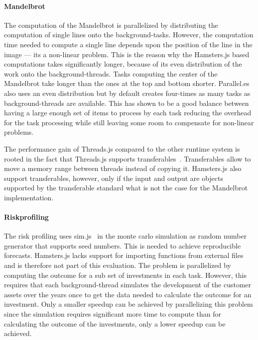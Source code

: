 \paragraph{Mandelbrot}
The computation of the Mandelbrot is parallelized by distributing the computation of single lines onto the background-tasks. However, the computation time needed to compute a single line depends upon the position of the line in the image --- its a non-linear problem. This is the reason why the Hamsters.js based computations takes significantly longer, because of its even distribution of the work onto the background-threads. Tasks computing the center of the Mandelbrot take longer than the ones at the top and bottom shorter. Parallel.es also uses an even distribution but by default creates four-times as many tasks as background-threads are available. This has shown to be a good balance between having a large enough set of items to process by each task reducing the overhead for the task processing while still leaving some room to compensate for non-linear problems. 

The performance gain of Threads.js compared to the other runtime system is rooted in the fact that Threads.js supports transferables~\cite[Section 2.7.4]{w3cHtml5}. Transferables allow to move a memory range between threads instead of copying it. Hamsters.js also support transferables, however, only if the input and output are objects supported by the transferable standard what is not the case for the Mandelbrot implementation.

\paragraph{Riskprofiling}
The risk profiling uses sim.js~\cite{simjs} in the monte carlo simulation as random number generator that supports seed numbers. This is needed to achieve reproducible forecasts. Hamsters.js lacks support for importing functions from external files and is therefore not part of this evaluation. The problem is parallelized by computing the outcome for a sub set of investments in each task. However, this requires that each background-thread simulates the development of the customer assets over the years once to get the data needed to calculate the outcome for an investment. Only a smaller speedup can be achieved by parallelizing this problem since the simulation requires significant more time to compute than for calculating the outcome of the investments, only a lower speedup can be achieved. 

